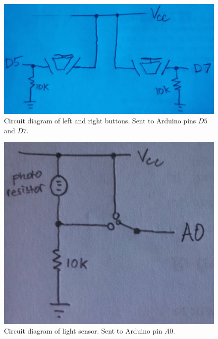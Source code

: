 \documentclass[paper=a4, fontsize=12pt]{scrartcl} 	%
\begin{document}
\begin{figure}
	\includegraphics[scale=0.16]{buttons.jpg}
	\caption{\label{buttons} Circuit diagram of left and right buttons.  Sent to Arduino pins $D5$ and $D7$.}
\end{figure}

\begin{figure}
	\includegraphics[scale=0.16]{light.jpg}
	\caption{\label{light} Circuit diagram of light sensor.  Sent to Arduino pin $A0$.}
\end{figure}
\end{document}
